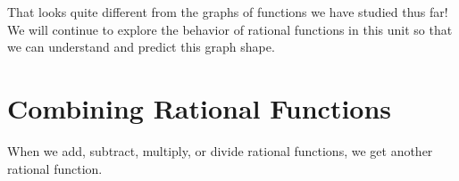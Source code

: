 \documentclass{ximera}
\begin{document}
\begin{example}
\begin{explanation}
That looks quite different from the graphs of functions we have studied thus far!  We will continue to explore the behavior of rational functions in this unit so that we can understand and predict this graph shape.
\end{explanation}
\end{example}

\section{Combining Rational Functions}

When we add, subtract, multiply, or divide rational functions, we get another rational function.


%
%
%
%
%
%
\end{document}
